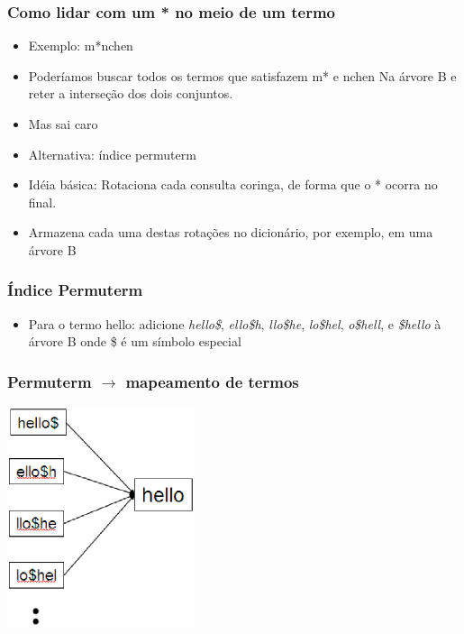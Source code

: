 \documentclass[compress]{beamer}
\def\term#1{{\sc #1}}   %
\def\query#1{{\sf #1}}
\begin{document}
\begin{frame}
\frametitle{Como lidar com um * no meio de um termo}
\begin{itemize}[<+->]
\item Exemplo: \query{m*nchen}
\item Poderíamos buscar todos os termos que satisfazem \query{m*} e
\query{*nchen} Na árvore B e reter a interseção dos dois conjuntos.
\item Mas sai caro
\item Alternativa: índice {\color{blue} permuterm} 
\item Idéia básica: Rotaciona cada consulta coringa, de forma que o * ocorra no 
final.
\item Armazena cada uma destas rotações no dicionário, por exemplo, em uma 
árvore B
\end{itemize}
\end{frame}

\begin{frame}
\frametitle{Índice Permuterm }
\begin{itemize}[<+->]
\item Para o termo \term{hello}: adicione 
\emph{hello\$},
\emph{ello\$h},
\emph{llo\$he},
\emph{lo\$hel}, 
\emph{o\$hell}, e
\emph{\$hello}
  à árvore B onde \$ é um símbolo especial
\end{itemize}
\end{frame}

\begin{frame}
\frametitle{Permuterm $\rightarrow$ mapeamento de termos}
\includegraphics[width=5.5cm]{permuterm.eps}
\end{frame}
\end{document}
